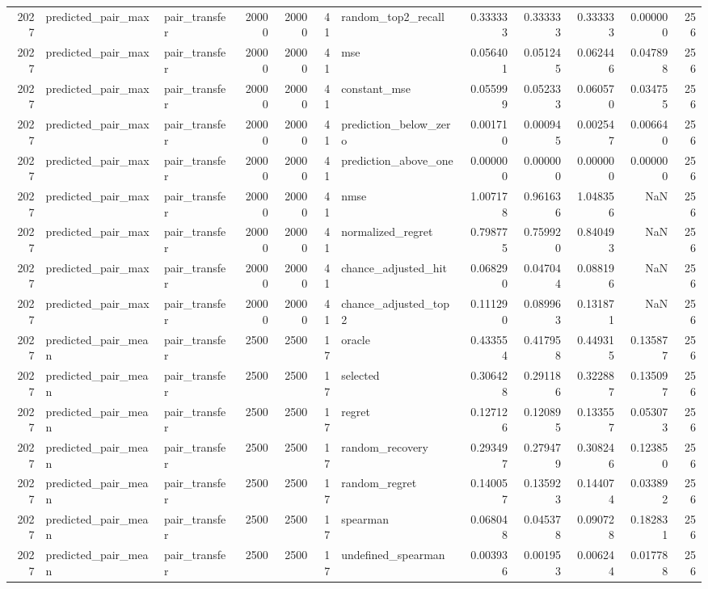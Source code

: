 \begin{tabular}{rllrrrlrrrrr}
2027 & predicted_pair_max & pair_transfer & 20000 & 20000 & 41 & random_top2_recall & 0.333333 & 0.333333 & 0.333333 & 0.000000 & 256 \\
2027 & predicted_pair_max & pair_transfer & 20000 & 20000 & 41 & mse & 0.056401 & 0.051245 & 0.062446 & 0.047898 & 256 \\
2027 & predicted_pair_max & pair_transfer & 20000 & 20000 & 41 & constant_mse & 0.055999 & 0.052333 & 0.060570 & 0.034755 & 256 \\
2027 & predicted_pair_max & pair_transfer & 20000 & 20000 & 41 & prediction_below_zero & 0.001710 & 0.000945 & 0.002547 & 0.006640 & 256 \\
2027 & predicted_pair_max & pair_transfer & 20000 & 20000 & 41 & prediction_above_one & 0.000000 & 0.000000 & 0.000000 & 0.000000 & 256 \\
2027 & predicted_pair_max & pair_transfer & 20000 & 20000 & 41 & nmse & 1.007178 & 0.961636 & 1.048356 & NaN & 256 \\
2027 & predicted_pair_max & pair_transfer & 20000 & 20000 & 41 & normalized_regret & 0.798775 & 0.759920 & 0.840493 & NaN & 256 \\
2027 & predicted_pair_max & pair_transfer & 20000 & 20000 & 41 & chance_adjusted_hit & 0.068290 & 0.047044 & 0.088196 & NaN & 256 \\
2027 & predicted_pair_max & pair_transfer & 20000 & 20000 & 41 & chance_adjusted_top2 & 0.111290 & 0.089963 & 0.131871 & NaN & 256 \\
2027 & predicted_pair_mean & pair_transfer & 2500 & 2500 & 17 & oracle & 0.433554 & 0.417958 & 0.449315 & 0.135877 & 256 \\
2027 & predicted_pair_mean & pair_transfer & 2500 & 2500 & 17 & selected & 0.306428 & 0.291186 & 0.322887 & 0.135097 & 256 \\
2027 & predicted_pair_mean & pair_transfer & 2500 & 2500 & 17 & regret & 0.127126 & 0.120895 & 0.133557 & 0.053073 & 256 \\
2027 & predicted_pair_mean & pair_transfer & 2500 & 2500 & 17 & random_recovery & 0.293497 & 0.279479 & 0.308246 & 0.123850 & 256 \\
2027 & predicted_pair_mean & pair_transfer & 2500 & 2500 & 17 & random_regret & 0.140057 & 0.135923 & 0.144074 & 0.033892 & 256 \\
2027 & predicted_pair_mean & pair_transfer & 2500 & 2500 & 17 & spearman & 0.068048 & 0.045378 & 0.090728 & 0.182831 & 256 \\
2027 & predicted_pair_mean & pair_transfer & 2500 & 2500 & 17 & undefined_spearman & 0.003936 & 0.001953 & 0.006244 & 0.017788 & 256 \\

\end{tabular}

